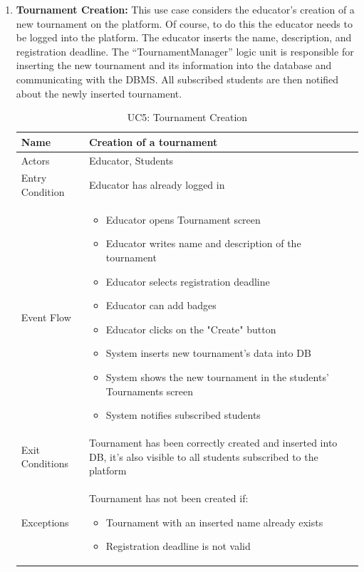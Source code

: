 \begin{enumerate}
   \item \textbf{Tournament Creation:}
    This use case considers the educator’s creation of a new tournament on the platform. Of course, to do this the educator needs to be logged into the platform. The educator inserts the name, description, and registration deadline. The “TournamentManager” logic unit is responsible for inserting the new tournament and its information into the database and communicating with the DBMS. All subscribed students are then notified about the newly inserted tournament.
    
   \begin{table}[H]
       \centering
       \begin{tabular}{|l|m{11cm}|}
        \hline
            Name & Creation of a tournament\\
        \hline
            Actors & Educator, Students\\
        \hline
            Entry Condition & Educator has already logged in\\
        \hline
            Event Flow & 
            \begin{itemize}
                \item Educator opens Tournament screen
                \item Educator writes name and description of the tournament
                \item Educator selects registration deadline
                \item Educator can add badges
                \item Educator clicks on the "Create" button
                \item System inserts new tournament's data into DB
                \item System shows the new tournament in the students' Tournaments screen
                \item System notifies subscribed students
            \end{itemize}\\
        \hline
            Exit Conditions & Tournament has been correctly created and inserted into DB, it's also visible to all students subscribed to the platform\\
        \hline
            Exceptions & Tournament has not been created if: 
            \begin{itemize}
                \item Tournament with an inserted name already exists
                \item Registration deadline is not valid
            \end{itemize}\\
        \hline
       \end{tabular}
       \caption{UC5: Tournament Creation}
       \label{tab:uc5}
   \end{table}
   

\end{enumerate}

